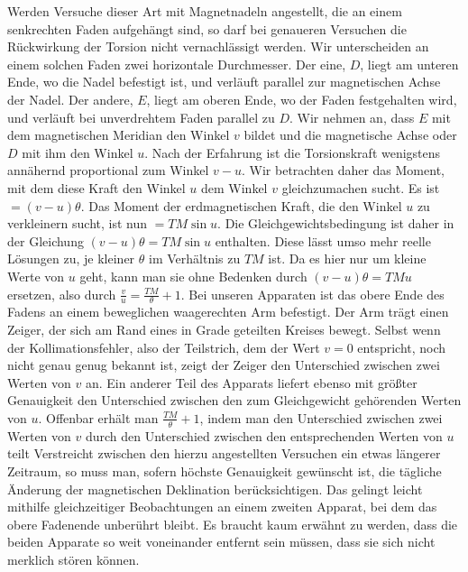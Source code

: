 Werden Versuche dieser Art mit Magnetnadeln angestellt, die an einem senkrechten Faden aufgehängt sind, so darf bei genaueren Versuchen die Rückwirkung der Torsion nicht vernachlässigt werden. Wir unterscheiden an einem solchen Faden zwei horizontale Durchmesser. Der eine, $D$, liegt am unteren Ende, wo die Nadel befestigt ist, und verläuft parallel zur magnetischen Achse der Nadel. Der andere, $E$, liegt am oberen Ende, wo der Faden festgehalten wird, und verläuft bei unverdrehtem Faden parallel zu $D$. Wir nehmen an, dass $E$ mit dem magnetischen Meridian den Winkel $v$ bildet und die magnetische Achse oder $D$ mit ihm den Winkel $u$. Nach der Erfahrung ist die Torsionskraft wenigstens annähernd proportional zum Winkel $v-u$. Wir betrachten daher das Moment, mit dem diese Kraft den Winkel $u$ dem Winkel $v$ gleichzumachen sucht. Es ist $=(v-u)\theta$. Das Moment der erdmagnetischen Kraft, die den Winkel $u$ zu verkleinern sucht, ist nun $=TM\sin u$. Die Gleichgewichtsbedingung ist daher in der Gleichung $(v-u)\theta=TM\sin u$ enthalten. Diese lässt umso mehr reelle Lösungen zu, je kleiner $\theta$ im Verhältnis zu $TM$ ist. Da es hier nur um kleine Werte von $u$ geht, kann man sie ohne Bedenken durch $(v-u)\theta=TMu$ ersetzen, also durch $\frac vu=\frac{TM}{\theta}+1$. Bei unseren Apparaten ist das obere Ende des Fadens an einem beweglichen waagerechten Arm befestigt. Der Arm trägt einen Zeiger, der sich am Rand eines in Grade geteilten Kreises bewegt. Selbst wenn der Kollimationsfehler, also der Teilstrich, dem der Wert $v=0$ entspricht, noch nicht genau genug bekannt ist, zeigt der Zeiger den Unterschied zwischen zwei Werten von $v$ an. Ein anderer Teil des Apparats liefert ebenso mit größter Genauigkeit den Unterschied zwischen den zum Gleichgewicht gehörenden Werten von $u$. Offenbar erhält man $\frac{TM}{\theta}+1$, indem man den Unterschied zwischen zwei Werten von $v$ durch den Unterschied zwischen den entsprechenden Werten von $u$ teilt Verstreicht zwischen den hierzu angestellten Versuchen ein etwas längerer Zeitraum, so muss man, sofern höchste Genauigkeit gewünscht ist, die tägliche Änderung der magnetischen Deklination berücksichtigen. Das gelingt leicht mithilfe gleichzeitiger Beobachtungen an einem zweiten Apparat, bei dem das obere Fadenende unberührt bleibt. Es braucht kaum erwähnt zu werden, dass die beiden Apparate so weit voneinander entfernt sein müssen, dass sie sich nicht merklich stören können.

